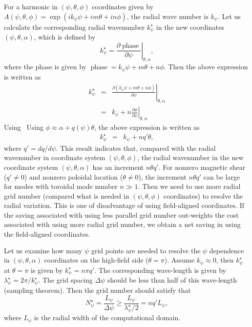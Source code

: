\documentclass{article}
\newcommand{\tmop}[1]{\ensuremath{\operatorname{#1}}}
\begin{document}
For a harmonic in $(\psi, \theta, \phi)$ coordinates given by $A (\psi,
\theta, \phi) = \exp (i k_{\psi} \psi + i m \theta + i n \phi)$, the radial
wave number is $k_{\psi}$. Let us calculate the corresponding radial
wavenumber $k_{\psi}^{\star}$ in the new coordinates $(\psi, \theta, \alpha)$,
which is defined by
\begin{equation}
  k_{\psi}^{\star} \left. = \frac{\partial \tmop{phase}}{\partial \psi}
  \right|_{\theta, \alpha},
\end{equation}
where the phase is given by $\tmop{phase} = k_{\psi} \psi + m \theta + n
\phi$. Then the above expression is written as
\begin{eqnarray}
  k_{\psi}^{\star} & = & \left. \frac{\partial (k_{\psi} \psi + m \theta + n
  \phi)}{\partial \psi} \right|_{\theta, \alpha} \nonumber\\
  & = & k_{\psi} + n \left. \frac{\partial \phi}{\partial \psi}
  \right|_{\theta, \alpha} 
\end{eqnarray}
Using \ Using $\phi \approx \alpha + q (\psi) \theta$, the above expression is
written as
\begin{eqnarray}
  k_{\psi}^{\star} & = & k_{\psi} + n q' \theta, 
\end{eqnarray}
where $q' = d q / d \psi$. This result indicates that, compared with the
radial wavenumber in coordinate system $(\psi, \theta, \phi)$, the radial
wavenumber in the new coordinate system $(\psi, \theta, \alpha)$ has an
increment $n \theta q'$. For nonzero magnetic shear ($q' \neq 0$) and nonzero
poloidal location ($\theta \neq 0$), the increment $n \theta q'$ can be large
for modes with toroidal mode number $n \gg 1$. Then we need to use more radial
grid number (compared what is needed in $(\psi, \theta, \phi)$ coordinates) to
resolve the radial variation. This is one of disadvantage of using
field-aligned coordinates. If the saving associated with using less parallel
grid number out-weights the cost associated with using more radial grid
number, we obtain a net saving in using the field-aligned coordinates.

Let us examine how many $\psi$ grid points are needed to resolve the $\psi$
dependence in $(\psi, \theta, \alpha)$ coordinates on the high-field side
($\theta = \pi$). Assume $k_{\psi} \approx 0$, then $k_{\psi}^{\star}$ at
$\theta = \pi$ is given by $k_{\psi}^{\star} = n \pi q'$. The corresponding
wave-length is given by $\lambda_{\psi}^{\star} = 2 \pi / k_{\psi}^{\star}$.
The grid spacing $\Delta \psi$ should be less than half of this wave-length
(sampling theorem). Then the grid number should satisfy that
\begin{equation}
  N_{\psi}^{\star} = \frac{L_{\psi}}{\Delta \psi} \geqslant
  \frac{L_{\psi}}{\lambda_{\psi}^{\star} / 2} = n q' L_{\psi},
\end{equation}
where $L_{\psi}$ is the radial width of the computational domain.
\end{document}
